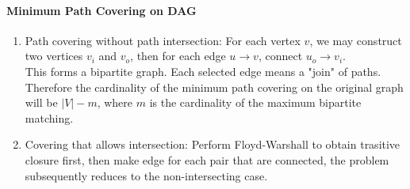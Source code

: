 \paragraph{Minimum Path Covering on DAG}
\begin{enumerate}
\item Path covering without path intersection: For each vertex $v$, we may construct two vertices $v_i$ and $v_o$, then for each edge $u\rightarrow v$, connect $u_o\rightarrow v_i$. \\
This forms a bipartite graph. Each selected edge means a "join" of paths. Therefore the cardinality of the minimum path covering on the original graph will be $|V| - m$, where $m$ is the cardinality of the maximum bipartite matching.
\item Covering that allows intersection: Perform Floyd-Warshall to obtain trasitive closure first, then make edge for each pair that are connected, the problem subsequently reduces to the non-intersecting case.
\end{enumerate}
